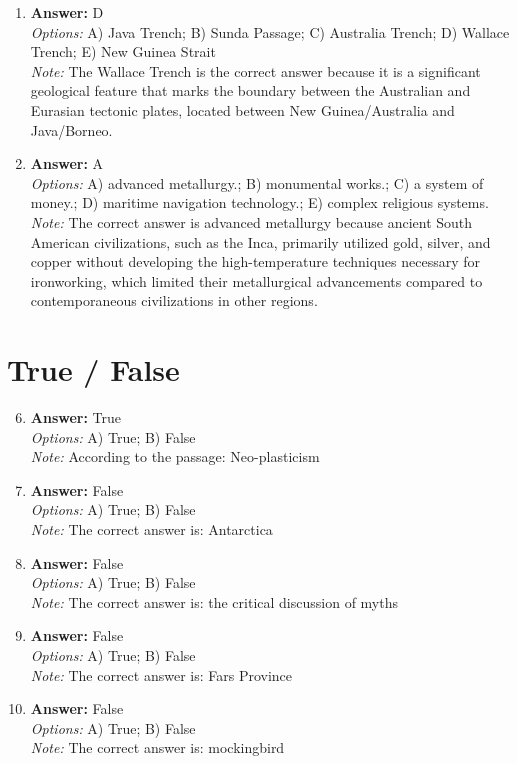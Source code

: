 \documentclass[12pt]{article}
\begin{document}
\begin{enumerate}[label=\arabic*.]
\item \textbf{Answer:} D
\\ \textit{Options:} A) Java Trench; B) Sunda Passage; C) Australia Trench; D) Wallace Trench; E) New Guinea Strait
\\ \textit{Note:} The Wallace Trench is the correct answer because it is a significant geological feature that marks the boundary between the Australian and Eurasian tectonic plates, located between New Guinea/Australia and Java/Borneo.
\item \textbf{Answer:} A
\\ \textit{Options:} A) advanced metallurgy.; B) monumental works.; C) a system of money.; D) maritime navigation technology.; E) complex religious systems.
\\ \textit{Note:} The correct answer is advanced metallurgy because ancient South American civilizations, such as the Inca, primarily utilized gold, silver, and copper without developing the high-temperature techniques necessary for ironworking, which limited their metallurgical advancements compared to contemporaneous civilizations in other regions.
\end{enumerate}

\section*{True / False}
\begin{enumerate}[label=\arabic*.]
\setcounter{enumi}{5}
\item \textbf{Answer:} True
\\ \textit{Options:} A) True; B) False
\\ \textit{Note:} According to the passage: Neo-plasticism
\item \textbf{Answer:} False
\\ \textit{Options:} A) True; B) False
\\ \textit{Note:} The correct answer is: Antarctica
\item \textbf{Answer:} False
\\ \textit{Options:} A) True; B) False
\\ \textit{Note:} The correct answer is: the critical discussion of myths
\item \textbf{Answer:} False
\\ \textit{Options:} A) True; B) False
\\ \textit{Note:} The correct answer is: Fars Province
\item \textbf{Answer:} False
\\ \textit{Options:} A) True; B) False
\\ \textit{Note:} The correct answer is: mockingbird
\end{enumerate}
\end{document}
